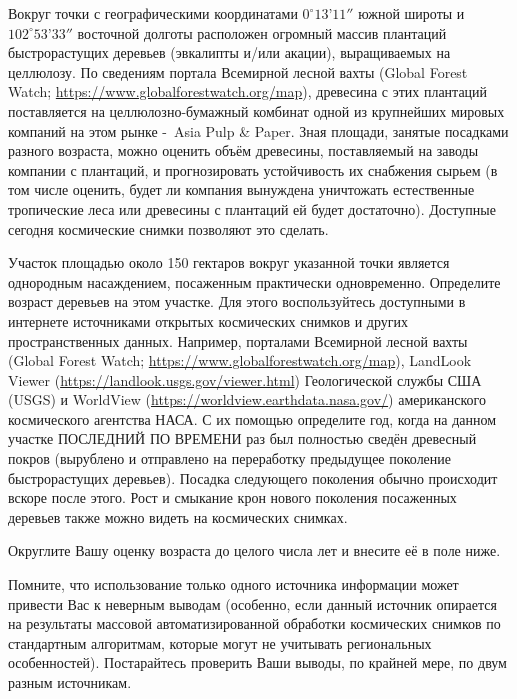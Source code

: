 
Вокруг точки с географическими координатами $0^{\circ}13’11''$ южной широты и $102^{\circ}53’33''$
восточной долготы расположен огромный массив плантаций быстрорастущих деревьев (эвкалипты и/или акации), выращиваемых на целлюлозу. 
По сведениям портала Всемирной лесной вахты (Global Forest Watch; \url{https://www.globalforestwatch.org/map}), древесина с этих плантаций поставляется на 
целлюлозно-бумажный комбинат одной из крупнейших мировых компаний на этом рынке - Asia Pulp \& Paper. 
Зная площади, занятые посадками разного возраста, можно оценить объём древесины, поставляемый на 
заводы компании с плантаций, и прогнозировать устойчивость их снабжения сырьем (в том числе оценить, 
будет ли компания вынуждена уничтожать естественные тропические леса или древесины с плантаций ей будет достаточно). 
Доступные сегодня космические снимки позволяют это сделать.

Участок площадью около 150 гектаров вокруг указанной точки является однородным насаждением, 
посаженным практически одновременно. Определите возраст деревьев на этом участке. 
Для этого воспользуйтесь доступными в интернете источниками открытых космических снимков и других 
пространственных данных. Например, порталами Всемирной лесной вахты (Global Forest Watch; \url{https://www.globalforestwatch.org/map}), 
LandLook Viewer (\url{https://landlook.usgs.gov/viewer.html}) Геологической службы США (USGS) и WorldView (\url{https://worldview.earthdata.nasa.gov/}) американского космического агентства НАСА. 
С их помощью определите год, когда на данном участке ПОСЛЕДНИЙ ПО ВРЕМЕНИ раз был полностью сведён древесный покров 
(вырублено и отправлено на переработку предыдущее поколение быстрорастущих деревьев). 
Посадка следующего поколения обычно происходит вскоре после этого. Рост и смыкание крон нового поколения посаженных 
деревьев также можно видеть на космических снимках.

Округлите Вашу оценку возраста до целого числа лет и внесите её в поле ниже.

Помните, что использование только одного источника информации может привести Вас к неверным выводам 
(особенно, если данный источник опирается на результаты массовой автоматизированной обработки 
космических снимков по стандартным алгоритмам, которые могут не учитывать региональных особенностей). 
Постарайтесь проверить Ваши выводы, по крайней мере, по двум разным источникам.

\solutionSection

